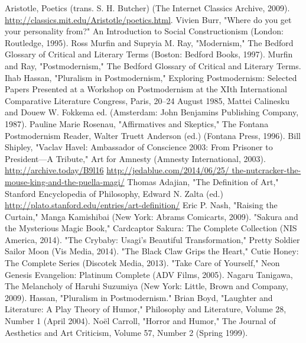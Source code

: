 \begin{thebibliography}{200}  
    Aristotle, Poetics (trans. S. H. Butcher) (The Internet Classics Archive, 2009).  \url{http://classics.mit.edu/Aristotle/poetics.html}.
    Vivien Burr, "Where do you get your personality from?" An Introduction to Social Constructionism (London: Routledge, 1995).
    Ross Murfin and Supryia M. Ray, "Modernism," The Bedford Glossary of Critical and Literary Terms (Boston: Bedford Books, 1997).
    Murfin and Ray, "Postmodernism," The Bedford Glossary of Critical and Literary Terms.
    Ihab Hassan, "Pluralism in Postmodernism," Exploring Postmodernism: Selected Papers Presented at a Workshop on Postmodernism at the XIth International Comparative Literature Congress, Paris, 20–24 August 1985, Mattei Calinesku and Douew W. Fokkema ed. (Amsterdam: John Benjamins Publishing Company, 1987). 
    Pauline Marie Rosenau, "Affirmatives and Skeptics," The Fontana Postmodernism Reader, Walter Truett Anderson (ed.) (Fontana Press, 1996).
    Bill Shipley, "Vaclav Havel: Ambassador of Conscience 2003: From Prisoner to President—A Tribute," Art for Amnesty (Amnesty International, 2003). \url{http://archive.today/B9l16}
    \url{http://jedablue.com/2014/06/25/ the-nutcracker-the-mouse-king-and-the-puella-magi/}
    Thomas Adajian, "The Definition of Art," Stanford Encyclopedia of Philosophy, Edward N. Zalta (ed.) \url{http://plato.stanford.edu/entries/art-definition/}
    Eric P. Nash, "Raising the Curtain," Manga Kamishibai (New York: Abrams Comicarts, 2009).
    "Sakura and the Mysterious Magic Book," Cardcaptor Sakura: The Complete Collection (NIS America, 2014).
    "The Crybaby: Usagi's Beautiful Transformation," Pretty Soldier Sailor Moon (Vis Media, 2014).
    "The Black Claw Grips the Heart," Cutie Honey: The Complete Series (Discotek Media, 2013).
    "Take Care of Yourself," Neon Genesis Evangelion: Platinum Complete (ADV Films, 2005).
    Nagaru Tanigawa, The Melancholy of Haruhi Suzumiya (New York: Little, Brown and Company, 2009).
    Hassan, "Pluralism in Postmodernism."
    Brian Boyd, "Laughter and Literature: A Play Theory of Humor," Philosophy and Literature, Volume 28, Number 1 (April 2004).
    Noël Carroll, "Horror and Humor," The Journal of Aesthetics and Art Criticism, Volume 57, Number 2 (Spring 1999).
    

\end{thebibliography}
